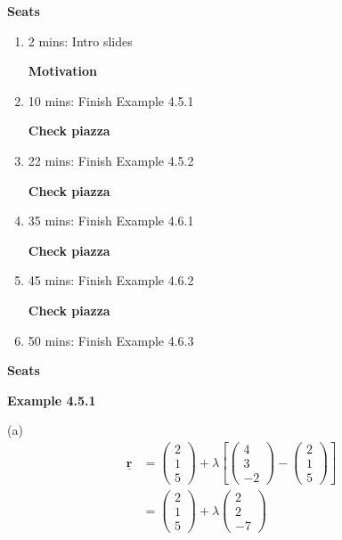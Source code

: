 \textbf{Seats}
\begin{enumerate}
    \item 2 mins: Intro slides \par
    \textbf{Motivation}
    \item 10 mins: Finish Example 4.5.1 \par
    \textbf{Check piazza}
    \item 22 mins: Finish Example 4.5.2 \par
    \textbf{Check piazza}
    \item 35 mins: Finish Example 4.6.1 \par
    \textbf{Check piazza}
    \item 45 mins: Finish Example 4.6.2 \par
    \textbf{Check piazza}
    \item 50 mins: Finish Example 4.6.3 \par
\end{enumerate}
\textbf{Seats}

\newcommand{\vect}[1]{\underline{\mathbf{#1}}}

\vspace{5mm} 
\textbf{Example 4.5.1} \par

(a) \begin{align*}
    \vect{r} &= \begin{pmatrix} 2 \\ 1 \\ 5 \end{pmatrix} + \lambda \left[\begin{pmatrix} 4 \\ 3 \\ -2 \end{pmatrix} - \begin{pmatrix} 2 \\ 1 \\ 5 \end{pmatrix}\right]\\
    &= \begin{pmatrix} 2 \\ 1 \\ 5 \end{pmatrix} + \lambda\begin{pmatrix} 2 \\ 2 \\ -7 \end{pmatrix}
\end{align*}

